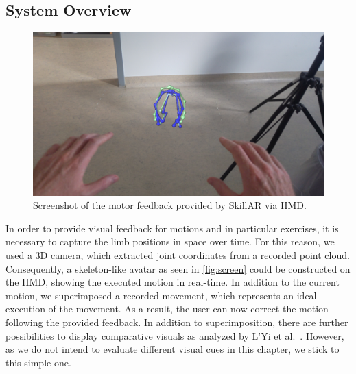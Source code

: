 \subsection{System Overview \label{sec:overview}}
\begin{figure}[h!]
	\centering
	\includegraphics[width=\linewidth]{pictures/HoloLensScreenshot.jpg}
	\caption{Screenshot of the motor feedback provided by SkillAR via HMD. \label{fig:screen}}
\end{figure}
In order to provide visual feedback for motions and in particular exercises, it is necessary to capture the limb positions in space over time. For this reason, we used a 3D camera, which extracted joint coordinates from a recorded point cloud. Consequently, a skeleton-like avatar as seen in \autoref{fig:screen} could be constructed on the HMD, showing the executed motion in real-time. In addition to the current motion, we superimposed a recorded movement, which represents an ideal execution of the movement. As a result, the user can now correct the motion following the provided feedback. In addition to superimposition, there are further possibilities to display comparative visuals as analyzed by L'Yi et al.~\cite{lyi2021comparative}. However, as we do not intend to evaluate different visual cues in this chapter, we stick to this simple one.

